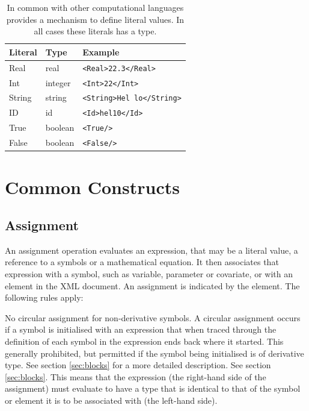 \begin{table}[ht!]
\begin{center}
\small
\begin{tabular}{lll}\toprule
Literal & Type & Example \\\midrule
Real & real & \verb|<Real>22.3</Real>|\\
Int & integer & \verb|<Int>22</Int>|\\
String & string & \verb|<String>Hel lo</String>|\\
ID & id & \verb|<Id>hel10</Id>|\\
True & boolean & \verb|<True/>|\\
False & boolean & \verb|<False/>|\\\bottomrule
\end{tabular}
\end{center}
\caption{In common with other computational languages \pharmml provides a
mechanism to define literal values. In all cases these literals has a
type.}
\label{tab:literal-types}
\end{table}%


\section{Common Constructs}

\subsection{Assignment}
\label{subsec:AssinmentRules}

An assignment operation evaluates an expression, that may be a literal
value, a reference to a symbols or a mathematical equation. It then
associates that expression with a symbol, such as variable, parameter
or covariate, or with an element in the XML document. An assignment is
indicated by the  element. The following rules apply:

\begin{valrules}
   {No circular assignment for non-derivative symbols.} A
  circular assignment occurs if a symbol is initialised with an
  expression that when traced through the definition of each symbol in
  the expression ends back where it started. This generally
  prohibited, but permitted if the symbol being initialised is of
  derivative type. See section \ref{sec:blocks} for a more detailed
  description.
%
   See section
  \ref{sec:blocks}.
%
This means that the expression (the right-hand side of the assignment)
must evaluate to have a type that is identical to that of the symbol
or element it is to be associated with (the left-hand side).
\end{valrules}

